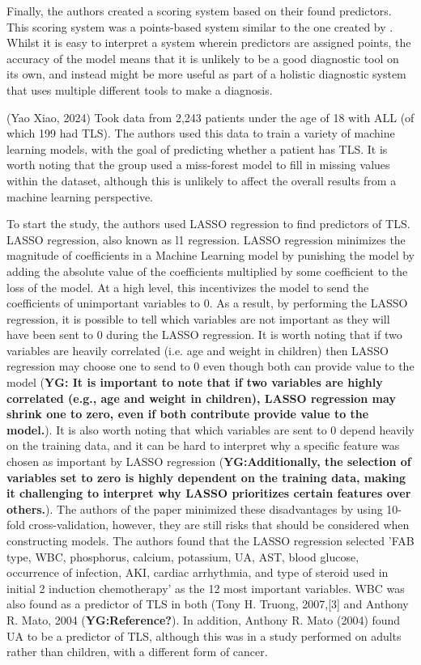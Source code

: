 \documentclass{article}
\begin{document}
Finally, the authors created a scoring system based on their found predictors. This scoring system was a points-based system similar to the one created by \cite{mato2004predictive}. Whilst it is easy to interpret a system wherein predictors are assigned points, the accuracy of the model means that it is unlikely to be a good diagnostic tool on its own, and instead might be more useful as part of a holistic diagnostic system that uses multiple different tools to make a diagnosis.

(Yao Xiao, 2024) Took data from 2,243 patients under the age of 18 with ALL (of which 199 had TLS). The authors used this data to train a variety of machine learning models, with the goal of predicting whether a patient has TLS. It is worth noting that the group used a miss-forest model to fill in missing values within the dataset, although this is unlikely to affect the overall results from a machine learning perspective.

To start the study, the authors used LASSO regression to find predictors of TLS. LASSO regression, also known as l1 regression. LASSO regression minimizes the magnitude of coefficients in a Machine Learning model by punishing the model by adding the absolute value of the coefficients multiplied by some coefficient to the loss of the model. At a high level, this incentivizes the model to send the coefficients of unimportant variables to 0. As a result, by performing the LASSO regression, it is possible to tell which variables are not important as they will have been sent to 0 during the LASSO regression. It is worth noting that if two variables are heavily correlated (i.e. age and weight in children) then LASSO regression may choose one to send to 0 even though both can provide value to the model (\textbf{YG: It is important to note that if two variables are highly correlated (e.g., age and weight in children), LASSO regression may shrink one to zero, even if both contribute provide value to the model.}). It is also worth noting that which variables are sent to 0 depend heavily on the training data, and it can be hard to interpret why a specific feature was chosen as important by LASSO regression (\textbf{YG:Additionally, the selection of variables set to zero is highly dependent on the training data, making it challenging to interpret why LASSO prioritizes certain features over others.}). The authors of the paper minimized these disadvantages by using 10-fold cross-validation, however, they are still risks that should be considered when constructing models. The authors found that the LASSO regression selected 'FAB type, WBC, phosphorus, calcium, potassium, UA, AST, blood glucose, occurrence of infection, AKI, cardiac arrhythmia, and type of steroid used in initial 2 induction chemotherapy' as the 12 most important variables. WBC was also found as a predictor of TLS in both (Tony H. Truong, 2007,[3] and Anthony R. Mato, 2004 (\textbf{YG:Reference?}). In addition, Anthony R. Mato (2004) found UA to be a predictor of TLS, although this was in a study performed on adults rather than children, with a different form of cancer.
\end{document}
